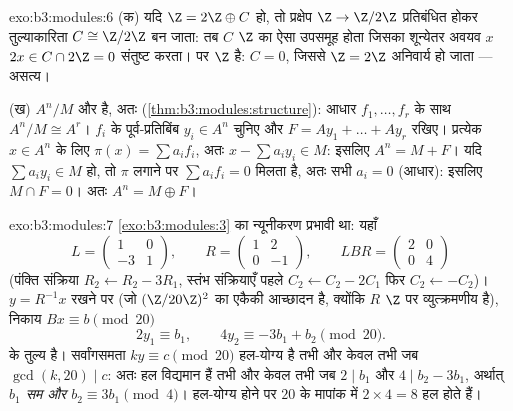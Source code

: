 \begin{solution}{exo:b3:modules:6}
(क) यदि $\Z = 2\Z \oplus C$ हो, तो प्रक्षेप $\Z \to \Z/2\Z$ प्रतिबंधित होकर तुल्याकारिता $C \cong \Z/2\Z$
बन जाता: तब $C$ $\Z$ का ऐसा उपसमूह होता जिसका शून्येतर अवयव $x$
$2x \in C
\cap 2\Z = 0$ संतुष्ट करता। पर $\Z$  है: $C = 0$, जिससे $\Z =
2\Z$ अनिवार्य
हो जाता --- असत्य।

(ख) $A^n/M$  और  है, अतः  (\cref{thm:b3:modules:structure}): आधार
$f_1, \dots, f_r$ के साथ $A^n/M \cong A^r$। $f_i$ के पूर्व-प्रतिबिंब $y_i \in A^n$ चुनिए और $F = Ay_1 + \dots + Ay_r$
रखिए। प्रत्येक $x \in A^n$ के लिए $\pi(x)
= \sum a_if_i$, अतः $x - \sum a_iy_i \in M$: इसलिए $A^n = M + F$। यदि
$\sum a_iy_i \in M$ हो, तो $\pi$ लगाने पर $\sum a_if_i = 0$ मिलता है, अतः सभी $a_i = 0$ (आधार):
इसलिए $M \cap F = 0$। अतः $A^n = M \oplus
F$।
\end{solution}

\begin{solution}{exo:b3:modules:7}
\cref{exo:b3:modules:3} का न्यूनीकरण प्रभावी था: यहाँ
\[
L = \begin{pmatrix} 1 & 0\\ -3 & 1\end{pmatrix},
\qquad
R = \begin{pmatrix} 1 & 2\\ 0 & -1 \end{pmatrix},
\qquad
LBR = \begin{pmatrix} 2 & 0\\ 0 & 4\end{pmatrix}
\]
(पंक्ति संक्रिया $R_2 \leftarrow R_2 - 3R_1$, स्तंभ संक्रियाएँ पहले $C_2 \leftarrow C_2 - 2C_1$ फिर $C_2 \leftarrow -C_2$)।
$y = R^{-1}x$ रखने पर (जो $(\Z/20\Z)^2$ का एकैकी आच्छादन है, क्योंकि $R$ $\Z$ पर
व्युत्क्रमणीय है), निकाय $Bx \equiv b \pmod{20}$
\[
2y_1 \equiv b_1, \qquad 4y_2 \equiv -3b_1 + b_2 \pmod{20}.
\]
के तुल्य है। सर्वांगसमता $ky \equiv c \pmod{20}$ हल-योग्य है तभी और केवल तभी जब $\gcd(k, 20) \mid c$:
अतः हल विद्यमान हैं तभी और केवल तभी जब $2 \mid b_1$ और $4
\mid b_2 - 3b_1$, अर्थात्
\emph{$b_1$ सम और $b_2 \equiv 3b_1
\pmod 4$}। हल-योग्य होने पर $20$ के मापांक में $2 \times 4 = 8$
हल होते हैं।
\end{solution}

